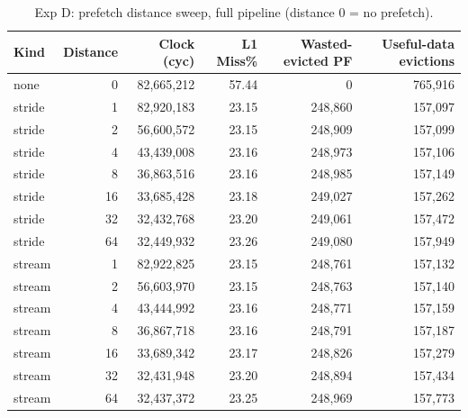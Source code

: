 \begin{table}[H]\centering\small
\begin{tabular}{lrrrrr}\toprule
Kind & Distance & Clock (cyc) & L1 Miss\% & Wasted-evicted PF & Useful-data evictions \\ \midrule
none & 0 & 82,665,212 & 57.44 & 0 & 765,916 \\
stride & 1 & 82,920,183 & 23.15 & 248,860 & 157,097 \\
stride & 2 & 56,600,572 & 23.15 & 248,909 & 157,099 \\
stride & 4 & 43,439,008 & 23.16 & 248,973 & 157,106 \\
stride & 8 & 36,863,516 & 23.16 & 248,985 & 157,149 \\
stride & 16 & 33,685,428 & 23.18 & 249,027 & 157,262 \\
stride & 32 & 32,432,768 & 23.20 & 249,061 & 157,472 \\
stride & 64 & 32,449,932 & 23.26 & 249,080 & 157,949 \\
stream & 1 & 82,922,825 & 23.15 & 248,761 & 157,132 \\
stream & 2 & 56,603,970 & 23.15 & 248,763 & 157,140 \\
stream & 4 & 43,444,992 & 23.16 & 248,771 & 157,159 \\
stream & 8 & 36,867,718 & 23.16 & 248,791 & 157,187 \\
stream & 16 & 33,689,342 & 23.17 & 248,826 & 157,279 \\
stream & 32 & 32,431,948 & 23.20 & 248,894 & 157,434 \\
stream & 64 & 32,437,372 & 23.25 & 248,969 & 157,773 \\
\bottomrule\end{tabular}
\caption{Exp D: prefetch distance sweep, full pipeline (distance 0 = no prefetch).}
\label{tab:expD}\end{table}

